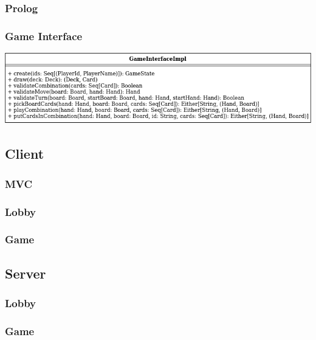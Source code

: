 \documentclass[a4paper,10pt]{article}
\begin{document}
    \subsubsection{Prolog}

    \subsubsection{Game Interface}
    \begin{center}
        \includegraphics[scale=0.5]{classi-Page-2.png}
    \end{center}

    \subsection{Client}

    \subsubsection{MVC}

    \subsubsection{Lobby}

    \subsubsection{Game}

    \subsection{Server}

    \subsubsection{Lobby}

    \subsubsection{Game}

    \newpage
\end{document}
